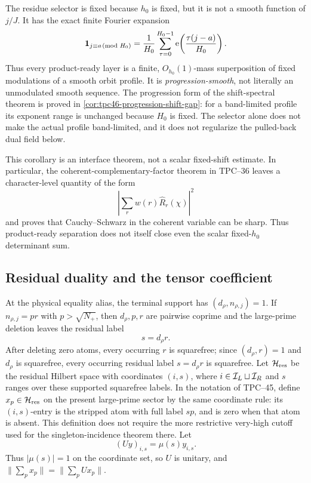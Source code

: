 The residue selector is fixed because \(h_0\) is fixed, but it is not a
smooth function of \(j/J\).  It has the exact finite Fourier expansion
\begin{equation}
 \mathbf 1_{j\equiv a\!\!\pmod{H_0}}
 =\frac1{H_0}\sum_{\tau=0}^{H_0-1}
 \mathrm e\!\left(\frac{\tau(j-a)}{H_0}\right).
 \label{eq:tpc46-residue-selector-Fourier}
\end{equation}
Thus every product-ready layer is a finite, \(O_{h_0}(1)\)-mass
superposition of fixed modulations of a smooth orbit profile.  It is
\emph{progression-smooth}, not literally an unmodulated smooth
sequence.  The progression form of the shift-spectral theorem is
proved in \cref{cor:tpc46-progression-shift-gap}: for a band-limited
profile its exponent range is unchanged because \(H_0\) is fixed.
The selector alone does not make the actual profile band-limited, and
it does not regularize the pulled-back dual field below.

This corollary is an interface theorem, not a scalar fixed-shift
estimate.  In particular, the coherent-complementary-factor theorem in
TPC--36 leaves a character-level quantity of the form
\begin{equation}
 \left|\sum_r w(r)\widehat R_r(\chi)\right|^2
 \label{eq:tpc46-inherited-coherent-gate}
\end{equation}
and proves that Cauchy--Schwarz in the coherent variable can be sharp.
Thus product-ready separation does not itself close even the scalar
fixed-\(h_0\) determinant sum.

\subsection{Residual duality and the tensor coefficient}

At the physical equality alias, the terminal support has
\((d_\rho,n_{\rho,j})=1\).  If \(n_{\rho,j}=pr\) with
\(p>\sqrt{N_+}\), then \(d_\rho,p,r\) are pairwise coprime and the
large-prime deletion leaves the residual label
\begin{equation}
 s=d_\rho r.
 \label{eq:tpc46-physical-residual-label}
\end{equation}
After deleting zero atoms, every occurring \(r\) is squarefree; since
\((d_\rho,r)=1\) and \(d_\rho\) is squarefree, every occurring
residual label \(s=d_\rho r\) is squarefree.  Let
\(\mathcal H_{\rm res}\) be the residual Hilbert space with coordinates
\((i,s)\), where \(i\in\mathcal I_L\sqcup\mathcal I_R\) and \(s\) ranges over these
supported squarefree labels.  In the notation of
TPC--45, define \(x_p\in\mathcal H_{\rm res}\) on the present large-prime
sector by the same coordinate rule: its \((i,s)\)-entry is the stripped
atom with full label \(sp\), and is zero when that atom is absent.  This
definition does not require the more restrictive very-high cutoff used
for the singleton-incidence theorem there.  Let
\begin{equation}
 (Uy)_{i,s}=\mu(s)y_{i,s}.
 \label{eq:tpc46-residual-unitary}
\end{equation}
Thus \(|\mu(s)|=1\) on the coordinate set, so \(U\) is unitary, and
\(\|\sum_p x_p\|=\|\sum_pUx_p\|\).

